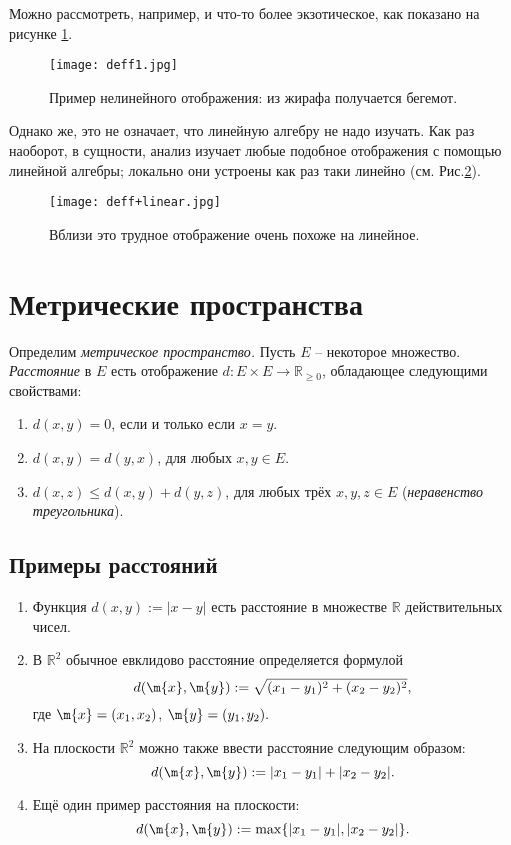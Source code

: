 Можно рассмотреть, например, и что-то более экзотическое, как показано на рисунке \ref{deff1}.

\begin{figure}
    \centering
    \texttt{[image: deff1.jpg]}
    \caption{Пример нелинейного отображения: из жирафа получается бегемот.}
    \label{deff1}
\end{figure}

Однако же, это не означает, что линейную алгебру не надо изучать. Как раз наоборот, в сущности, анализ изучает любые подобное отображения с помощью линейной алгебры; локально они устроены как раз таки линейно (см. Рис.\ref{deff+linear}).

\begin{figure}
    \centering
    \texttt{[image: deff+linear.jpg]}
    \caption{Вблизи это трудное отображение очень похоже на линейное.}
    \label{deff+linear}
\end{figure}




\section{Метрические пространства}

Определим \textit{метрическое пространство.} Пусть $E$ -- некоторое множество. \textit{Расстояние} в $E$ есть отображение $d:E\times E \to \mathbb{R}_{\ge 0}$, обладающее следующими свойствами:
\begin{enumerate}
    \item $d(x,y) = 0$, если и только если $x = y$.
    \item $d(x,y)=d(y,x)$, для любых $x,y \in E$.
    \item $d(x,z) \le d(x,y) + d(y,z)$, для любых трёх $x,y,z\in E$ (\textit{неравенство треугольника}).
\end{enumerate}

\subsection{Примеры расстояний}

 \begin{enumerate}
     \item Функция $d(x,y):=|x-y|$ есть расстояние в множестве $\mathbb{R}$ действительных чисел.
     \item В $\mathbb{R}^2$ обычное евклидово расстояние определяется формулой
     \[
       d(\m{x}, \m{y}):= \sqrt{(x_1 -y_1)^2 + (x_2 - y_2)^2},
     \]
     где $\m{x} = (x_1,x_2)$, $\m{y} = (y_1,y_2).$
     \item На плоскости $\mathbb{R}^2$ можно также ввести расстояние следующим образом:
     \[
      d(\m{x},\m{y}):= |x_1-y_1| + |x_2-y_2|.
     \]
     \item Ещё один пример расстояния на плоскости:
     \[
       d(\m{x},\m{y}):=\max\{|x_1 - y_1|, |x_2 - y_2|\}.
     \]
 \end{enumerate}


